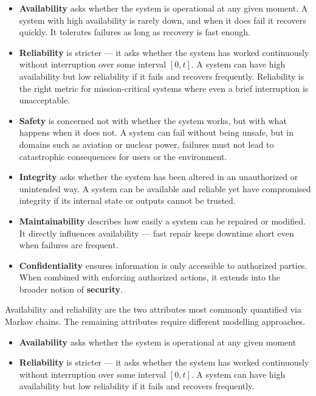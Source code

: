 \begin{itemize}

    \item \textbf{Availability} asks whether the system is operational at any given moment. 
    A system with high availability is rarely down, and when it does fail it recovers 
    quickly. It tolerates failures as long as recovery is fast enough.

    \item \textbf{Reliability} is stricter — it asks whether the system has worked 
    continuously without interruption over some interval $[0, t]$. A system can have 
    high availability but low reliability if it fails and recovers frequently. Reliability 
    is the right metric for mission-critical systems where even a brief interruption 
    is unacceptable.

    \item \textbf{Safety} is concerned not with whether the system works, but with what 
    happens when it does not. A system can fail without being unsafe, but in domains 
    such as aviation or nuclear power, failures must not lead to catastrophic consequences 
    for users or the environment.

    \item \textbf{Integrity} asks whether the system has been altered in an unauthorized 
    or unintended way. A system can be available and reliable yet have compromised 
    integrity if its internal state or outputs cannot be trusted.

    \item \textbf{Maintainability} describes how easily a system can be repaired or 
    modified. It directly influences availability — fast repair keeps downtime short 
    even when failures are frequent.

    \item \textbf{Confidentiality} ensures information is only accessible to authorized 
    parties. When combined with enforcing authorized actions, it extends into the 
    broader notion of \textbf{security}.

\end{itemize}

\begin{keybox}
    Availability and reliability are the two attributes most commonly 
    quantified via Markov chains. The remaining attributes require 
    different modelling approaches.
    \begin{itemize}
        \item \textbf{Availability} asks whether the system is operational at any given moment
        \item \textbf{Reliability} is stricter — it asks whether the system has worked 
    continuously without interruption over some interval $[0, t]$. A system can have 
    high availability but low reliability if it fails and recovers frequently.
    \end{itemize}
    
\end{keybox}



